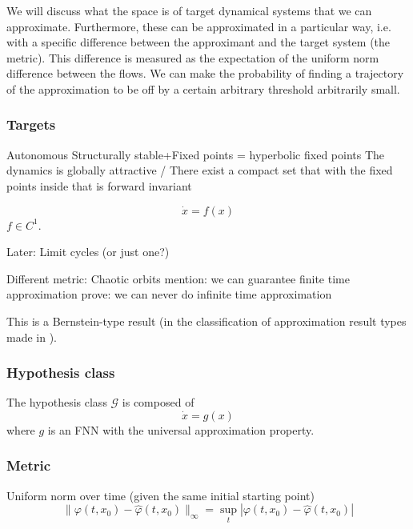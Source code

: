 \documentclass{article}
\theoremstyle{definition}
\theoremstyle{remark}
\begin{document}
We will discuss what the space is of target dynamical systems that we can approximate.
Furthermore, these can be approximated in a particular way, i.e. with a specific difference between the approximant and the target system (the metric).
This difference is measured as the expectation of the uniform norm difference between the flows. 
We can make the probability of finding a trajectory of the approximation to be off by a certain arbitrary threshold arbitrarily small. 


\subsubsection{Targets}
Autonomous
Structurally stable+Fixed points = hyperbolic fixed points
The dynamics is globally attractive / There exist a compact set that with the fixed points inside that is forward invariant 

\begin{equation}
\dot x = f(x)
\end{equation}
$f\in C^1$.



Later: Limit cycles (or just one?)



Different metric: Chaotic orbits
mention: we can guarantee finite time approximation
prove: we can never do infinite time approximation 


This is a Bernstein-type result (in the classification of approximation result types made in \citep{jiang2023brief}).


\subsubsection{Hypothesis class}
The hypothesis class $\mathcal{G}$ is composed of
\begin{equation}
\dot x = g(x) 
\end{equation}
where $g$ is an FNN with the universal approximation property.


\subsubsection{Metric}

Uniform norm over time (given the same initial starting point)
\begin{equation}
\|\varphi(t,x_0)-\hat \varphi(t,x_0)\|_\infty = \sup_t|\varphi(t,x_0)-\hat \varphi(t,x_0)|
\end{equation}
\end{document}
